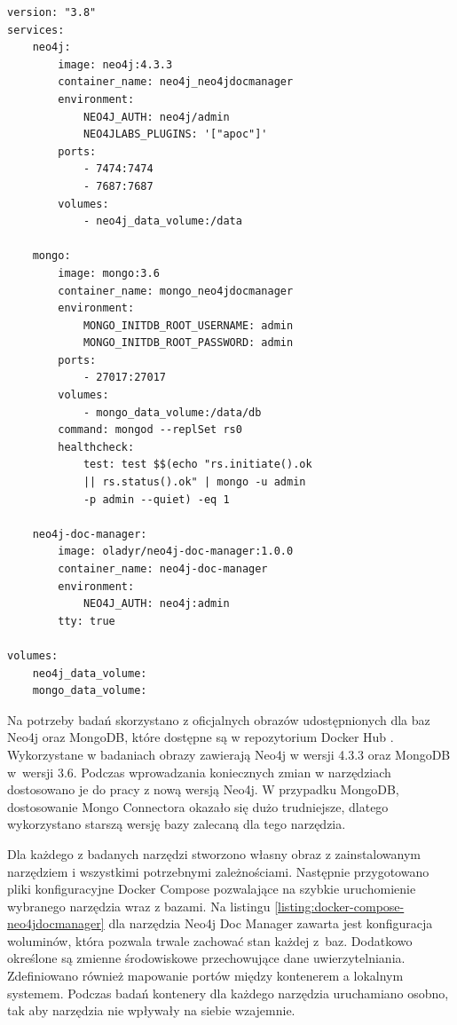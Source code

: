 \documentclass[a4paper,twoside,12pt]{book}
\begin{document}
\begin{lstlisting}[style=JS, caption={Plik konfiguracyjny dla narzędzia Neo4j Doc Manager.}, label={listing:docker-compose-neo4jdocmanager}, captionpos=b]
version: "3.8"
services:
    neo4j:
        image: neo4j:4.3.3
        container_name: neo4j_neo4jdocmanager
        environment:
            NEO4J_AUTH: neo4j/admin
            NEO4JLABS_PLUGINS: '["apoc"]'
        ports:
            - 7474:7474
            - 7687:7687
        volumes:
            - neo4j_data_volume:/data
            
    mongo:
        image: mongo:3.6
        container_name: mongo_neo4jdocmanager
        environment:
            MONGO_INITDB_ROOT_USERNAME: admin
            MONGO_INITDB_ROOT_PASSWORD: admin
        ports:
            - 27017:27017      
        volumes:
            - mongo_data_volume:/data/db
        command: mongod --replSet rs0 
        healthcheck:
            test: test $$(echo "rs.initiate().ok 
            || rs.status().ok" | mongo -u admin 
            -p admin --quiet) -eq 1
        
    neo4j-doc-manager:
        image: oladyr/neo4j-doc-manager:1.0.0
        container_name: neo4j-doc-manager
        environment:
            NEO4J_AUTH: neo4j:admin
        tty: true

volumes:
    neo4j_data_volume:
    mongo_data_volume:
\end{lstlisting}

Na potrzeby badań skorzystano z oficjalnych obrazów udostępnionych dla baz Neo4j oraz MongoDB, które dostępne są w repozytorium Docker Hub \cite{bib:dockerhub-mongo, bib:dockerhub-neo}. Wykorzystane w badaniach obrazy zawierają Neo4j w wersji 4.3.3 oraz MongoDB w~wersji 3.6. Podczas wprowadzania koniecznych zmian w narzędziach dostosowano je do pracy z nową wersją Neo4j. W przypadku MongoDB, dostosowanie Mongo Connectora okazało się dużo trudniejsze, dlatego wykorzystano starszą wersję bazy zalecaną dla tego narzędzia.

Dla każdego z badanych narzędzi stworzono własny obraz z zainstalowanym narzędziem i wszystkimi potrzebnymi zależnościami. Następnie przygotowano pliki konfiguracyjne Docker Compose pozwalające na szybkie uruchomienie wybranego narzędzia wraz z bazami. Na listingu \ref{listing:docker-compose-neo4jdocmanager} dla narzędzia Neo4j Doc Manager zawarta jest konfiguracja woluminów, która pozwala trwale zachować stan każdej z~baz. Dodatkowo określone są zmienne środowiskowe przechowujące dane uwierzytelniania. Zdefiniowano również mapowanie portów między kontenerem a lokalnym systemem. Podczas badań kontenery dla każdego narzędzia uruchamiano osobno, tak aby narzędzia nie wpływały na siebie wzajemnie.  
\end{document}
